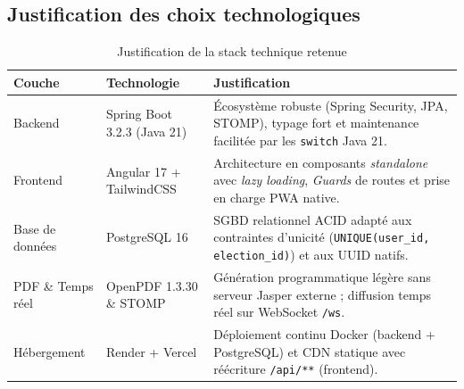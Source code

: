 \subsection{Justification des choix technologiques}
\begin{table}[H]
\centering
\caption{Justification de la stack technique retenue}
\label{tab:choix-tech}
\small
\begin{tabularx}{\textwidth}{@{}llX@{}}
\toprule
\rowcolor{uaszlight}
\textbf{Couche} & \textbf{Technologie} & \textbf{Justification} \\
\midrule
Backend & Spring Boot 3.2.3 (Java 21) & Écosystème robuste (Spring Security, JPA, STOMP), typage fort et maintenance facilitée par les \texttt{switch} Java 21. \\
Frontend & Angular 17 + TailwindCSS & Architecture en composants \textit{standalone} avec \textit{lazy loading}, \textit{Guards} de routes et prise en charge PWA native. \\
Base de données & PostgreSQL 16 & SGBD relationnel ACID adapté aux contraintes d'unicité (\texttt{UNIQUE(user\_id, election\_id)}) et aux UUID natifs. \\
PDF \& Temps réel & OpenPDF 1.3.30 \& STOMP & Génération programmatique légère sans serveur Jasper externe ; diffusion temps réel sur WebSocket \texttt{/ws}. \\
Hébergement & Render + Vercel & Déploiement continu Docker (backend + PostgreSQL) et CDN statique avec réécriture \texttt{/api/**} (frontend). \\
\bottomrule
\end{tabularx}
\end{table}

